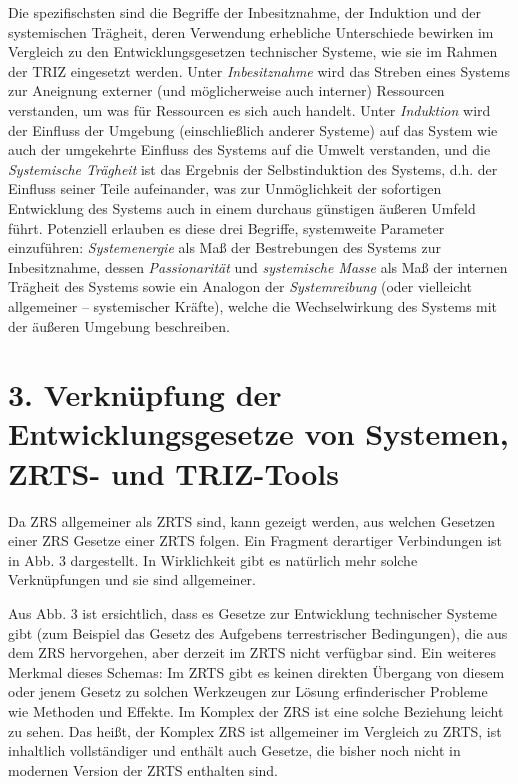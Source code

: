 \documentclass[11pt,a4paper]{article}
\begin{document}
Die spezifischsten sind die Begriffe der Inbesitznahme, der Induktion und der
systemischen Trägheit, deren Verwendung erhebliche Unterschiede bewirken im
Vergleich zu den Entwicklungsgesetzen technischer Systeme, wie sie im Rahmen
der TRIZ eingesetzt werden. Unter \emph{Inbesitznahme} wird das Streben eines
Systems zur Aneignung externer (und möglicherweise auch interner) Ressourcen
verstanden, um was für Ressourcen es sich auch handelt. Unter \emph{Induktion}
wird der Einfluss der Umgebung (einschließlich anderer Systeme) auf das System
wie auch der umgekehrte Einfluss des Systems auf die Umwelt verstanden, und
die \emph{Systemische Trägheit} ist das Ergebnis der Selbstinduktion des
Systems, d.h. der Einfluss seiner Teile aufeinander, was zur Unmöglichkeit der
sofortigen Entwicklung des Systems auch in einem durchaus günstigen äußeren
Umfeld führt. Potenziell erlauben es diese drei Begriffe, systemweite
Parameter einzuführen: \emph{Systemenergie} als Maß der Bestrebungen des
Systems zur Inbesitznahme, dessen \emph{Passionarität} und \emph{systemische
  Masse} als Maß der internen Trägheit des Systems sowie ein Analogon der
\emph{Systemreibung} (oder vielleicht allgemeiner -- systemischer Kräfte),
welche die Wechselwirkung des Systems mit der äußeren Umgebung beschreiben.

\section*{3. Verknüpfung der Entwicklungsgesetze von Systemen,\\ ZRTS- und
  TRIZ-Tools}

Da ZRS allgemeiner als ZRTS sind, kann gezeigt werden, aus welchen Gesetzen
einer ZRS Gesetze einer ZRTS folgen. Ein Fragment derartiger Verbindungen ist
in Abb. 3 dargestellt. In Wirklichkeit gibt es natürlich mehr solche
Verknüpfungen und sie sind allgemeiner.

Aus Abb. 3 ist ersichtlich, dass es Gesetze zur Entwicklung technischer
Systeme gibt (zum Beispiel das Gesetz des Aufgebens terrestrischer
Bedingungen), die aus dem ZRS hervorgehen, aber derzeit im ZRTS nicht
verfügbar sind. Ein weiteres Merkmal dieses Schemas: Im ZRTS gibt es keinen
direkten Übergang von diesem oder jenem Gesetz zu solchen Werkzeugen zur
Lösung erfinderischer Probleme wie Methoden und Effekte. Im Komplex der ZRS
ist eine solche Beziehung leicht zu sehen. Das heißt, der Komplex ZRS ist
allgemeiner im Vergleich zu ZRTS, ist inhaltlich vollständiger und enthält
auch Gesetze, die bisher noch nicht in modernen Version der ZRTS enthalten
sind.
\end{document}
